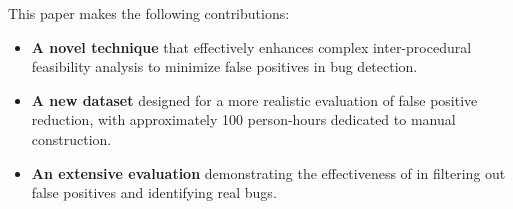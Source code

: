 This paper makes the following contributions:

\begin{itemize}[itemsep=2pt,topsep=0pt,parsep=0pt]

\item \textbf{A novel technique} that effectively enhances  complex inter-procedural feasibility analysis to minimize false positives in bug detection.

\item \textbf{A new dataset} designed for a more realistic evaluation of false positive reduction, with approximately 100 person-hours dedicated to manual construction.

\item \textbf{An extensive evaluation} demonstrating the effectiveness of \app{} in filtering out false positives and identifying real bugs. 
\end{itemize}

